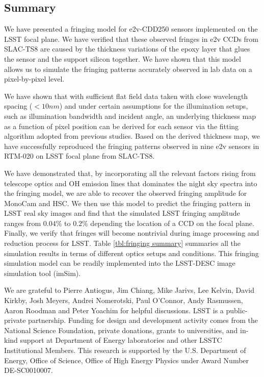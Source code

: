 \documentclass[twocolumn]{aastex63} %
\begin{document}
\begin{CJK*}{UTF8}{gbsn}


\section{Summary}
We have presented a fringing model for e2v-CDD250 sensors implemented on the LSST focal plane. We have verified that these observed fringes in e2v CCDs from SLAC-TS8 are caused by the thickness variations of the epoxy layer that glues the sensor and the support silicon together. We have shown that this model allows us to simulate the fringing patterns accurately observed in lab data on a pixel-by-pixel level. 

We have shown that with sufficient flat field data taken with close wavelength spacing ($< 10nm$) and under certain assumptions for the illumination setups, such as illumination bandwidth and incident angle, an underlying thickness map as a function of pixel position can be derived for each sensor via the fitting algorithm adopted from previous studies. Based on the derived thickness map, we have successfully reproduced the fringing patterns observed in nine e2v sensors in RTM-020 on LSST focal plane from SLAC-TS8. %

We have demonstrated that, by incorporating all the relevant factors rising from telescope optics and OH emission lines that dominates the night sky spectra into the fringing model, we are able to recover the observed fringing amplitude for MonoCam \citep{Brooks17} and HSC. We then use this model to predict the fringing pattern in LSST real sky images and find that the simulated LSST fringing amplitude ranges from $0.04\%$  to $0.2\%$ depending the location of a CCD on the focal plane. Finally, we verify that fringes will become nontrivial during image processing and reduction process for LSST. Table \ref{tbl:fringing summary} summaries all the simulation results in terms of different optics setups and conditions. This fringing simulation model can be readily implemented into the LSST-DESC image simulation tool (imSim).



\acknowledgements
We are grateful to Pierre Antiogus, Jim Chiang, Mike Jarivs, Lee Kelvin, David Kirkby, Josh Meyers, Andrei Nomerotski, Paul O'Connor, Andy Rasmussen, Aaron Roodman and Peter Yoachim for helpful discussions.
LSST is a public-private partnership. Funding for design and development activity comes from the National Science Foundation, private donations, grants to universities, and in-kind support at Department of Energy laboratories and other LSSTC Institutional Members. This research is supported by the U.S. Department of Energy, Office  of  Science,  Office  of  High  Energy  Physics  under Award Number DE-SC0010007.


\end{CJK*}
\end{document}
